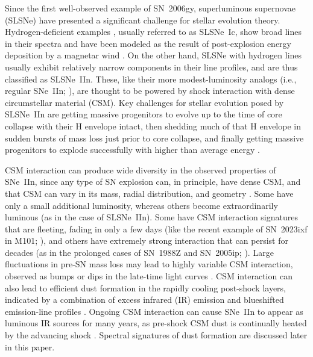 \documentclass[fleqn,usenatbib,useAMS]{mnras}
\begin{document}
Since the first well-observed example of SN~2006gy, superluminous
supernovae (SLSNe) have presented a significant challenge for stellar
evolution theory.  Hydrogen-deficient examples \citep{quimby11},
usually referred to as SLSNe~Ic, show broad lines in their spectra and
have been modeled as the result of post-explosion energy deposition by
a magnetar wind \citep{woosley10,kb10}.  On the other hand, SLSNe with
hydrogen lines usually exhibit relatively narrow components in their line profiles,
and are thus classified as SLSNe~IIn. These, like
their more modest-luminosity analogs (i.e., regular SNe~IIn; \citealt{schlegel90,filippenko97}), 
are thought to be powered by shock interaction
with dense circumstellar material (CSM).  Key challenges for
stellar evolution posed by SLSNe~IIn are getting massive
progenitors to evolve up to the time of core collapse with their H
envelope intact, then shedding much of that H envelope in
sudden bursts of mass loss just prior to core collapse, and finally
getting massive progenitors to explode successfully with higher than
average energy \citep[see][]{smith07,smith10,groh13}.

CSM interaction can produce wide diversity in the observed properties
of SNe~IIn, since any type of SN explosion can, in principle, have
dense CSM, and that CSM can vary in its mass, radial distribution, and
geometry \citep[see][for a review of interacting SNe]{smith17}.  Some
have only a small additional luminosity, whereas others become
extraordinarily luminous (as in the case of SLSNe~IIn).  Some have
CSM interaction signatures that are fleeting, fading in only a few
days (like the recent example of SN~2023ixf in M101;
\citealt{wynn23,smith23,azalee23}), and others have extremely strong
interaction that can persist for decades (as in the prolonged cases of
SN~1988Z and SN~2005ip;
\citealt{smith17sn05ip,smith09sn05ip,fox10,williams02}).  Large fluctuations 
in pre-SN mass loss may lead to highly variable CSM interaction, observed as
bumps or dips in the late-time light curves \citep{nyholm17,smith17sn05ip}.
CSM interaction can also lead to efficient dust formation in the rapidly
cooling post-shock layers, indicated by a combination of excess infrared (IR)
emission and blueshifted emission-line profiles 
\citep{smith08jc,smith09sn05ip,smith12,gall14,smith20}.  Ongoing
CSM interaction can cause SNe~IIn to appear as luminous IR
sources for many years, as pre-shock CSM dust is continually heated by
the advancing shock \citep{fox13,fox13gl,fox15,fox20}.  Spectral
signatures of dust formation are discussed later in this paper.
\end{document}
